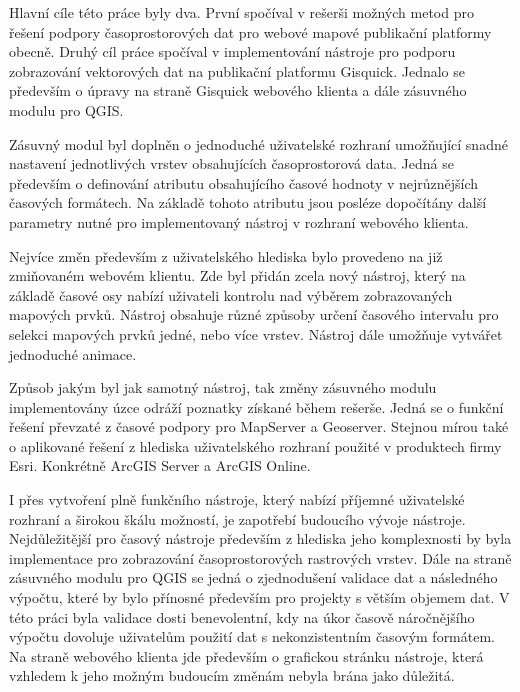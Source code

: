 \newpage
{}

Hlavní cíle této práce byly dva. První spočíval v rešerši možných
metod pro řešení podpory časoprostorových dat pro webové mapové
publikační platformy obecně. Druhý cíl práce spočíval v implementování
nástroje pro podporu zobrazování vektorových dat na publikační
platformu Gisquick. Jednalo se především o úpravy na straně Gisquick
webového klienta a dále zásuvného modulu pro QGIS.

Zásuvný modul byl doplněn o jednoduché uživatelské rozhraní umožňující
snadné nastavení jednotlivých vrstev obsahujících časoprostorová
data. Jedná se především o definování atributu obsahujícího časové
hodnoty v nejrůznějších časových formátech. Na základě tohoto atributu
jsou posléze dopočítány další parametry nutné pro implementovaný
nástroj v rozhraní webového klienta.

Nejvíce změn především z uživatelského hlediska bylo provedeno na již
zmiňovaném webovém klientu. Zde byl přidán zcela nový nástroj, který
na základě časové osy nabízí uživateli kontrolu nad výběrem
zobrazovaných mapových prvků. Nástroj obsahuje různé způsoby určení
časového intervalu pro selekci mapových prvků jedné, nebo více
vrstev. Nástroj dále umožňuje vytvářet jednoduché animace.

Způsob jakým byl jak samotný nástroj, tak změny zásuvného modulu
implementovány úzce odráží poznatky získané během rešerše. Jedná se o
funkční řešení převzaté z časové podpory pro MapServer a
Geoserver. Stejnou mírou také o aplikované řešení z hlediska
uživatelského rozhraní použité v produktech firmy Esri. Konkrétně
ArcGIS Server a ArcGIS Online.

I přes vytvoření plně funkčního nástroje, který nabízí příjemné
uživatelské rozhraní a širokou škálu možností, je zapotřebí budoucího
vývoje nástroje. Nejdůležitější pro časový nástroje především z
hlediska jeho komplexnosti by byla implementace pro zobrazování
časoprostorových rastrových vrstev. Dále na straně zásuvného modulu
pro QGIS se jedná o zjednodušení validace dat a následného výpočtu,
které by bylo přínosné především pro projekty s větším objemem dat. V
této práci byla validace dosti benevolentní, kdy na úkor časově
náročnějšího výpočtu dovoluje uživatelům použití dat s nekonzistentním
časovým formátem. Na straně webového klienta jde především o grafickou
stránku nástroje, která vzhledem k jeho možným budoucím změnám nebyla
brána jako důležitá.
